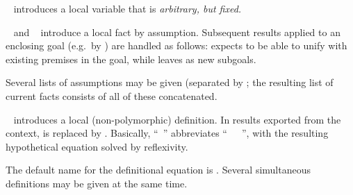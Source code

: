 \begin{isabellebody}
\begin{isamarkuptext}
  \begin{descr}
  
  \item [\isa{\isacommand{fix}}~\isa{x}] introduces a local variable
   that is \emph{arbitrary, but fixed.}
  
  \item [\isa{\isacommand{assume}}~\isa{a{\isacharcolon}\ {\isasymphi}} and \isa{\isacommand{presume}}~\isa{a{\isacharcolon}\ {\isasymphi}}] introduce a local fact \isa{{\isasymphi}\ {\isasymturnstile}\ {\isasymphi}} by
  assumption.  Subsequent results applied to an enclosing goal (e.g.\
  by ) are handled as follows:  expects to be able to unify with existing premises in the
  goal, while \isa{\isacommand{presume}} leaves \isa{{\isasymphi}} as new subgoals.
  
  Several lists of assumptions may be given (separated by
  ; the resulting list of current facts consists
  of all of these concatenated.
  
  \item [\isa{\isacommand{def}}~\isa{x\ {\isasymequiv}\ t}] introduces a local
  (non-polymorphic) definition.  In results exported from the context,
  \isa{x} is replaced by \isa{t}.  Basically, ``\isa{\isacommand{def}}~'' abbreviates ``~~~'', with the resulting
  hypothetical equation solved by reflexivity.
  
  The default name for the definitional equation is .
  Several simultaneous definitions may be given at the same time.

  \end{descr}


\end{isamarkuptext}
\end{isabellebody}
